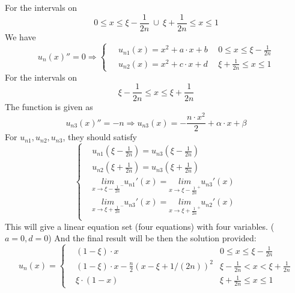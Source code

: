 \documentclass{article}
\begin{document}
\subsection{}
\normalsize
	
For the intervals on 
\[
	0 \leq x \leq \xi - \frac{1}{2n}\  \cup\ \xi + \frac{1}{2n} \leq x \leq 1
\]
We have 
\[
	u_n(x)'' = 0 \Rightarrow \left\{\begin{aligned}
	&u_{n1}(x) = x^2+ a\cdot x+ b\ \  & 0 \leq x \leq \xi - \frac{1}{2n} \\\
 	&u_{n2}(x) = x^2+ c\cdot x+ d & \xi + \frac{1}{2n} \leq x \leq 1
	\end{aligned}\right.
\]
For the intervals on 
\[
	\xi - \frac{1}{2n} \leq x \leq \xi + \frac{1}{2n}
\]
The function is given as
\[
	u_{n3}(x)'' = -n \Rightarrow u_{n3}(x) = -\frac{n\cdot x^2}{2}+ \alpha\cdot x+ \beta
\]
For $u_{n1}, u_{n2}, u_{n3}$, they should satisfy
\[	\left\{
	\begin{aligned}
	&u_{n1}(\xi- \frac{1}{2n}) = u_{n3} (\xi - \frac{1}{2n})\\
	&u_{n2}(\xi+ \frac{1}{2n}) = u_{n3} (\xi + \frac{1}{2n})\\
	&\underset{x\rightarrow \xi- \frac{1}{2n}^-}{lim} u_{n1}'(x) =  \underset{x\rightarrow \xi- \frac{1}{2n}^+}{lim} u_{n3}'(x)\\
	&\underset{x\rightarrow \xi+ \frac{1}{2n}^-}{lim} u_{n3}'(x) =  \underset{x\rightarrow \xi+ \frac{1}{2n}^+}{lim} u_{n2}'(x)\\
	\end{aligned}
	\right.
\]
This will give a linear equation set (four equations) with four variables. ($a=0,d=0$)
And the final result will be then the solution provided:
\[
	u_n(x) = \left\{
	\begin{aligned}
	&(1- \xi) \cdot  x  & 0 \leq x \leq \xi - \frac{1}{2n} \\
	&(1- \xi) \cdot x - \frac{n}{2}(x- \xi+1/(2n))^2  & \xi - \frac{1}{2n} < x < \xi + \frac{1}{2n} \\
	&\xi \cdot  (1-x) & \xi + \frac{1}{2n} \leq x \leq 1
	\end{aligned}
	\right.
\]
\end{document}

